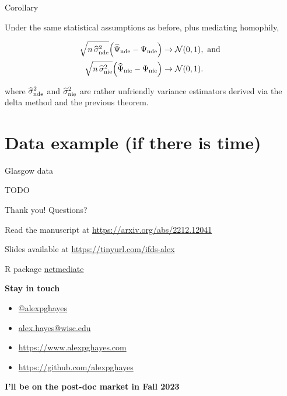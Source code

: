\documentclass{beamer}
\theoremstyle{remark}
\begin{document}
\begin{frame}{Corollary}

    \begin{theorem}

        \vspace{2mm}

        Under the same statistical assumptions as before, plus mediating homophily,

        \begin{align*}
            \sqrt{n \, \sigmahatnde} \paren*{\ndehat - \nde}
             & \to
            \Normal{0}{1}, \text { and } \\
            \sqrt{n \, \sigmahatnie} \paren*{\niehat - \nie}
             & \to
            \Normal{0}{1}.
        \end{align*}

        \noindent where $\widehat{\sigma}^2_\mathrm{nde}$ and $\widehat{\sigma}^2_\mathrm{nie}$ are rather unfriendly variance estimators derived via the delta method and the previous theorem.

    \end{theorem}

\end{frame}

\section{Data example (if there is time)}

\begin{frame}{Glasgow data}

    TODO

\end{frame}


\begin{frame}{Thank you! Questions?}

    Read the manuscript at \url{https://arxiv.org/abs/2212.12041}

    Slides available at \url{https://tinyurl.com/ifds-alex}

    R package \href{https://github.com/alexpghayes/netmediate}{netmediate}

    \textbf{Stay in touch}

    \begin{itemize}
        \item[]  \href{https://twitter.com/alexpghayes}{@alexpghayes}
        \item[]  \href{mailto:alex.hayes@wisc.edu}{alex.hayes@wisc.edu}
        \item[]  \url{https://www.alexpghayes.com} %
        \item[]  \url{https://github.com/alexpghayes}
    \end{itemize}

    \textbf{I'll be on the post-doc market in Fall 2023}
\end{frame}
\end{document}
